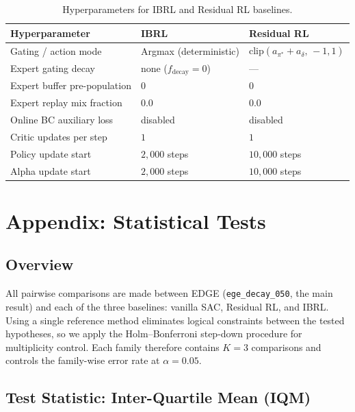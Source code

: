 \begin{table}[h]
\centering
\caption{Hyperparameters for IBRL and Residual RL baselines.}
\label{tab:baselines_hp}
\begin{tabular}{lll}
\toprule
\textbf{Hyperparameter} & \textbf{IBRL} & \textbf{Residual RL} \\
\midrule
Gating / action mode         & Argmax (deterministic) & $\mathrm{clip}(a_{\pi^*} + a_\delta,\,-1,1)$ \\
Expert gating decay          & none ($f_{\mathrm{decay}}=0$) & — \\
Expert buffer pre-population & $0$            & $0$ \\
Expert replay mix fraction   & $0.0$          & $0.0$ \\
Online BC auxiliary loss     & disabled       & disabled \\
Critic updates per step      & $1$            & $1$ \\
Policy update start          & $2{,}000$ steps & $10{,}000$ steps \\
Alpha update start           & $2{,}000$ steps & $10{,}000$ steps \\
\bottomrule
\end{tabular}
\end{table}

\section*{Appendix: Statistical Tests}
\label{app:stats}

\subsection*{Overview}

All pairwise comparisons are made between EDGE (\texttt{ege\_decay\_050}, the
main result) and each of the three baselines: vanilla SAC, Residual RL, and
IBRL.
Using a single reference method eliminates logical constraints between the
tested hypotheses, so we apply the Holm–Bonferroni step-down procedure for
multiplicity control.
Each family therefore contains $K = 3$ comparisons and controls the
family-wise error rate at $\alpha = 0.05$.

\subsection*{Test Statistic: Inter-Quartile Mean (IQM)}

